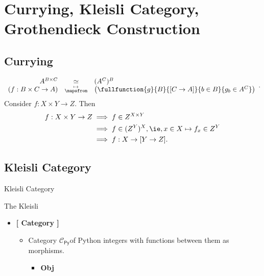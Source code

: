 \section{Currying, Kleisli Category, Grothendieck Construction}
\subsection{Currying}
\begin{note}
\[
\begin{array}{rcl}
	A^{B\times C}&\simeq &(A^C)^B \\
	(f:B\times C\to A)&\substack{\mapsto\\ \mapsfrom} &\left(\fullfunction{g}{B}{[C\to A]}{b\in B}{g_b\in A^C}\right)
\end{array}.
\] Consider $f:X\times Y\to Z$. Then\begin{align*}
	f:X\times Y\to Z&\implies f\in Z^{X\times Y} \\
	&\implies f\in (Z^{Y})^X, \ie, x\in X\mapsto f_x\in Z^Y \\
	&\implies f:X\to[Y\to Z].
\end{align*}
\end{note}

\newpage
\subsection{Kleisli Category}
\begin{defbox}{Kleisli Category}
\begin{definition}
	The Kleisli
\end{definition}
\end{defbox}

\begin{itemize}
	\item[] \textbf{[ Category ]}
	\begin{itemize}
		\item[] Category $\mathcal{C}_{\mathsf{Py}}$of Python integers with functions between them as morphisms.
		\begin{itemize}
			\item \textbf{Obj}
		\end{itemize}
	\end{itemize}
\end{itemize}

